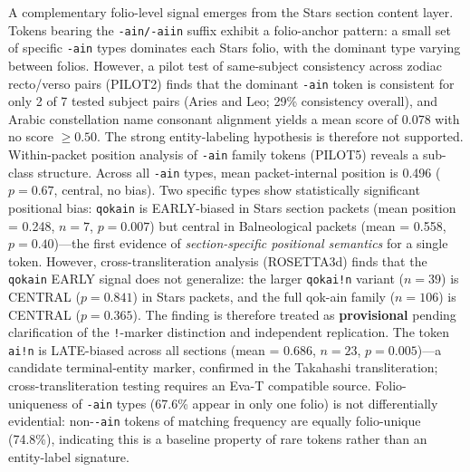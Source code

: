 \documentclass[11pt,a4paper,twocolumn]{article}
\begin{document}
A complementary folio-level signal emerges from the Stars section content layer. Tokens bearing the \texttt{-ain/-aiin} suffix exhibit a folio-anchor pattern: a small set of specific \texttt{-ain} types dominates each Stars folio, with the dominant type varying between folios. However, a pilot test of same-subject consistency across zodiac recto/verso pairs (PILOT2) finds that the dominant \texttt{-ain} token is consistent for only 2 of 7 tested subject pairs (Aries and Leo; 29\% consistency overall), and Arabic constellation name consonant alignment yields a mean score of 0.078 with no score $\geq 0.50$. The strong entity-labeling hypothesis is therefore not supported. %
Within-packet position analysis of \texttt{-ain} family tokens (PILOT5) reveals a sub-class structure. Across all \texttt{-ain} types, mean packet-internal position is 0.496 ($p = 0.67$, central, no bias). Two specific types show statistically significant positional bias: \texttt{qokain} is EARLY-biased in Stars section packets (mean position = 0.248, $n = 7$, $p = 0.007$) but central in Balneological packets (mean = 0.558, $p = 0.40$)---the first evidence of \textit{section-specific positional semantics} for a single token. However, cross-transliteration analysis (ROSETTA3d) finds that the \texttt{qokain} EARLY signal does not generalize: the larger \texttt{qokai!n} variant ($n = 39$) is CENTRAL ($p = 0.841$) in Stars packets, and the full qok-ain family ($n = 106$) is CENTRAL ($p = 0.365$). The finding is therefore treated as \textbf{provisional} pending clarification of the \texttt{!}-marker distinction and independent replication. The token \texttt{ai!n} is LATE-biased across all sections (mean = 0.686, $n = 23$, $p = 0.005$)---a candidate terminal-entity marker, confirmed in the Takahashi transliteration; cross-transliteration testing requires an Eva-T compatible source. Folio-uniqueness of \texttt{-ain} types (67.6\% appear in only one folio) is not differentially evidential: non-\texttt{-ain} tokens of matching frequency are equally folio-unique (74.8\%), indicating this is a baseline property of rare tokens rather than an entity-label signature.
\end{document}
